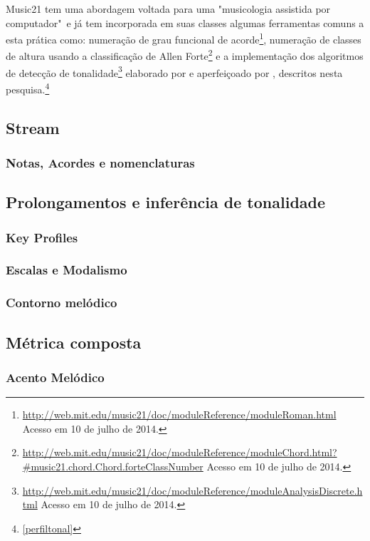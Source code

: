 \documentclass[
	12pt,				%
	openright,			%
	twoside,			%
	a4paper,			%
	english,			%
	french,				%
	spanish,			%
	brazil				%
	]{abntex2}
\begin{document}
Music21 tem uma abordagem voltada para uma "musicologia assistida por computador"\ e já tem incorporada em suas classes algumas ferramentas comuns a esta prática como: numeração de grau funcional de acorde\footnote{\url{http://web.mit.edu/music21/doc/moduleReference/moduleRoman.html} Acesso em 10 de julho de 2014.}, numeração de classes de altura usando a classificação de Allen Forte\footnote{\url{http://web.mit.edu/music21/doc/moduleReference/moduleChord.html?\#music21.chord.Chord.forteClassNumber} Acesso em 10 de julho de 2014.} e a implementação dos algoritmos de detecção de tonalidade\footnote{\url{http://web.mit.edu/music21/doc/moduleReference/moduleAnalysisDiscrete.html} Acesso em 10 de julho de 2014.} elaborado por  e aperfeiçoado por , descritos nesta pesquisa.\footnote{\autoref{perfiltonal}}

\subsection{Stream}


\subsubsection{Notas, Acordes e nomenclaturas}


\subsection{Prolongamentos e inferência de tonalidade}

\subsubsection{Key Profiles}

\subsubsection{Escalas e Modalismo}

\subsubsection{Contorno melódico}

\subsection{Métrica composta}

\subsubsection{Acento Melódico}
\end{document}
